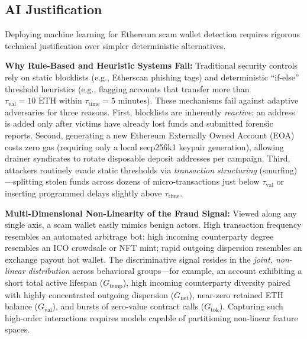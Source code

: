 \documentclass[conference]{IEEEtran}
\begin{document}
\subsection{AI Justification}
Deploying machine learning for Ethereum scam wallet detection requires rigorous technical justification over simpler deterministic alternatives.

\textbf{Why Rule-Based and Heuristic Systems Fail:} Traditional security controls rely on static blocklists (e.g., Etherscan phishing tags) and deterministic ``if-else'' threshold heuristics (e.g., flagging accounts that transfer more than $\tau_{\text{val}} = 10\text{ ETH}$ within $\tau_{\text{time}} = 5\text{ minutes}$). These mechanisms fail against adaptive adversaries for three reasons. First, blocklists are inherently \emph{reactive}: an address is added only after victims have already lost funds and submitted forensic reports. Second, generating a new Ethereum Externally Owned Account (EOA) costs zero gas (requiring only a local secp256k1 keypair generation), allowing drainer syndicates to rotate disposable deposit addresses per campaign. Third, attackers routinely evade static thresholds via \emph{transaction structuring} (smurfing)---splitting stolen funds across dozens of micro-transactions just below $\tau_{\text{val}}$ or inserting programmed delays slightly above $\tau_{\text{time}}$.

\textbf{Multi-Dimensional Non-Linearity of the Fraud Signal:} Viewed along any single axis, a scam wallet easily mimics benign actors. High transaction frequency resembles an automated arbitrage bot; high incoming counterparty degree resembles an ICO crowdsale or NFT mint; rapid outgoing dispersion resembles an exchange payout hot wallet. The discriminative signal resides in the \emph{joint, non-linear distribution} across behavioral groups---for example, an account exhibiting a short total active lifespan ($G_{\text{temp}}$), high incoming counterparty diversity paired with highly concentrated outgoing dispersion ($G_{\text{net}}$), near-zero retained ETH balance ($G_{\text{val}}$), and bursts of zero-value contract calls ($G_{\text{tok}}$). Capturing such high-order interactions requires models capable of partitioning non-linear feature spaces.
\end{document}
